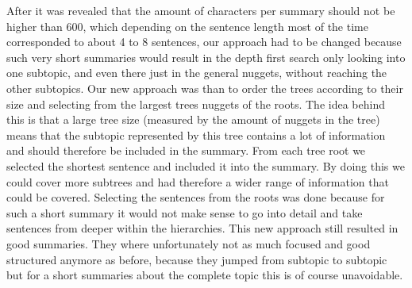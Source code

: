 After it was revealed that the amount of characters per summary should not be
higher than 600, which depending on the sentence length most of the time
corresponded to about 4 to 8 sentences, our approach had to be changed because such very short summaries would result in the depth first search only looking into one subtopic, and even
there just in the general nuggets, without reaching the other subtopics. Our new
approach was than to order the trees according to their size and selecting from
the largest trees nuggets of the roots. The idea behind this is that a large tree
size (measured by the amount of nuggets in the tree) means that the subtopic represented by
this tree contains a lot of information and should therefore be included in the
summary. From each tree root we selected the shortest sentence and included it
into the summary. By doing this we could cover more subtrees and had therefore a
wider range of information that could be covered. Selecting the sentences from
the roots was done because for such a short summary it would not make sense to
go into detail and take sentences from deeper within the hierarchies. This new
approach still resulted in good summaries. They where unfortunately not as much focused and
good structured anymore as before, because they jumped from subtopic to subtopic but for a short summaries about the complete topic this is of course unavoidable.

